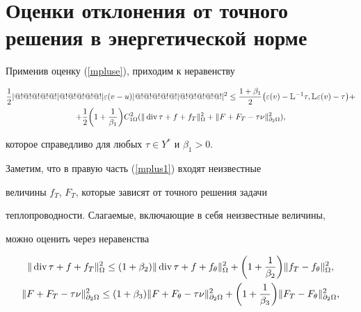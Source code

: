 \section{Оценки отклонения от точного решения в энергетической норме}





Применив оценку (\ref{mpluse}), приходим к неравенству


\begin{multline}


\frac{1}{2}\norme{\varepsilon(v-u)}^2 \le \frac{1+\beta_1}{2}


\big(\varepsilon(v) -{\Bbb L}^{-1}\tau, {\Bbb


L}\varepsilon(v) - \tau\big) +\\


%


+\frac{1}{2}\bigg(1+\frac{1}{\beta_1} \bigg) C_{1\Omega}^2


(\norm{\Div \tau + f + f_T}^2_{\Omega} +


\norm{F+F_T-\tau\nu}^2_{\partial_2\Omega}),


\label{mplus1}


\end{multline}


которое справедливо для любых $\tau \in Y^*$ и $\beta_1>0$.


Заметим, что в правую часть (\ref{mplus1}) входят неизвестные


величины $f_T$, $F_T$, которые зависят от точного решения задачи


теплопроводности. Слагаемые, включающие в себя неизвестные величины,


можно оценить через неравенства


\begin{gather*}


\norm{\Div \tau + f + f_T}^2_{\Omega}\le 


(1+\beta_2) \norm{\Div \tau + f + f_{\theta}}^2_{\Omega}


+\bigg(1+\frac{1}{\beta_2}\bigg)


\norm{f_T-f_\theta}^2_\Omega,\\


%


\norm{F+F_T-\tau\nu}^2_{\partial_2\Omega} \le 


(1+\beta_3) \norm{F+F_\theta-\tau\nu}^2_{\partial_2\Omega}


+\bigg(1+\frac{1}{\beta_3}\bigg)


\norm{F_T-F_\theta}^2_{\partial_2\Omega},


\end{gather*}


